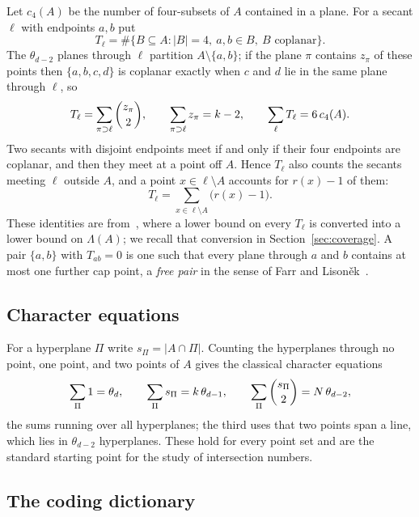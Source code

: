 Let \(c_4(A)\) be the number of four-subsets of \(A\) contained in a
plane.  For a secant \(\ell\) with endpoints \(a,b\) put
\[
 T_\ell=\#\bigl\{B\subseteq A:|B|=4,\ a,b\in B,\ B\text{ coplanar}\bigr\}.
\]
The \(\theta_{d-2}\) planes through \(\ell\) partition \(A\setminus\{a,b\}\);
if the plane \(\pi\) contains \(z_\pi\) of these points then
\(\{a,b,c,d\}\) is coplanar exactly when \(c\) and \(d\) lie in the same
plane through \(\ell\), so
\begin{equation}
 T_\ell=\sum_{\pi\supset\ell}\binom{z_\pi}{2},
 \qquad
 \sum_{\pi\supset\ell}z_\pi=k-2,
 \qquad
 \sum_{\ell}T_\ell=6\,c_4(A).
\label{eq:pencil}
\end{equation}
Two secants with disjoint endpoints meet if and only if their four
endpoints are coplanar, and then they meet at a point off \(A\).  Hence
\(T_\ell\) also counts the secants meeting \(\ell\) outside \(A\), and a
point \(x\in\ell\setminus A\) accounts for \(r(x)-1\) of them:
\begin{equation}
 T_\ell=\sum_{x\in\ell\setminus A}\bigl(r(x)-1\bigr).
\label{eq:secant-collisions}
\end{equation}
These identities are from~\cite[Section~5]{RuddSecantDefects}, where a
lower bound on every \(T_\ell\) is converted into a lower bound on
\(\Lambda(A)\); we recall that conversion in Section~\ref{sec:coverage}.
A pair \(\{a,b\}\) with \(T_{ab}=0\) is one such that every plane through
\(a\) and \(b\) contains at most one further cap point, a \emph{free
pair} in the sense of Farr and
Lison\v{e}k~\cite{FarrLisonek2006a,FarrLisonek2006}.

\subsection{Character equations}

For a hyperplane \(\Pi\) write \(s_\Pi=|A\cap\Pi|\).  Counting the
hyperplanes through no point, one point, and two points of \(A\) gives
the classical character equations
\begin{equation}
 \sum_{\Pi}1=\theta_d,
 \qquad
 \sum_{\Pi}s_\Pi=k\,\theta_{d-1},
 \qquad
 \sum_{\Pi}\binom{s_\Pi}{2}=N\,\theta_{d-2},
\label{eq:character}
\end{equation}
the sums running over all hyperplanes; the third uses that two points
span a line, which lies in \(\theta_{d-2}\) hyperplanes.  These hold for
every point set and are the standard starting point for the study of
intersection numbers.

\subsection{The coding dictionary}

